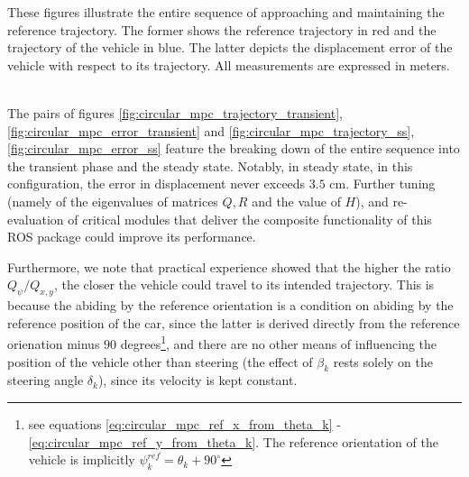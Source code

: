 These figures illustrate the entire sequence of approaching and maintaining
the reference trajectory. The former shows the reference trajectory in red
and the trajectory of the vehicle in blue. The latter depicts the displacement
error of the vehicle with respect to its trajectory. All measurements are
expressed in meters.

\noindent{}\\

The pairs of figures \ref{fig:circular_mpc_trajectory_transient}, \ref{fig:circular_mpc_error_transient}
and \ref{fig:circular_mpc_trajectory_ss}, \ref{fig:circular_mpc_error_ss}
feature the breaking down of the entire sequence into the transient phase
and the steady state. Notably, in steady state, in this configuration, the
error in displacement never exceeds $3.5$ cm. Further tuning (namely of the
eigenvalues of matrices $Q,R$ and the value of $H$), and re-evaluation
of critical modules that deliver the composite functionality of this ROS
package could improve its performance.

Furthermore, we note that practical experience showed that the higher the ratio
$Q_{\psi} / Q_{x,y}$, the closer the vehicle could travel to its intended
trajectory. This is because the abiding by the reference orientation is a
condition on abiding by the reference position of the car, since the latter
is derived directly from the reference orienation minus $90$ degrees\footnote{
see equations \ref{eq:circular_mpc_ref_x_from_theta_k} -
\ref{eq:circular_mpc_ref_y_from_theta_k}. The reference orientation of the
vehicle is implicitly $\psi_k^{ref} = \theta_k + 90^{\circ}$}, and there are
no other means of influencing the position of the vehicle other than steering
(the effect of $\beta_k$ rests solely on the steering angle $\delta_k$), since
its velocity is kept constant.


